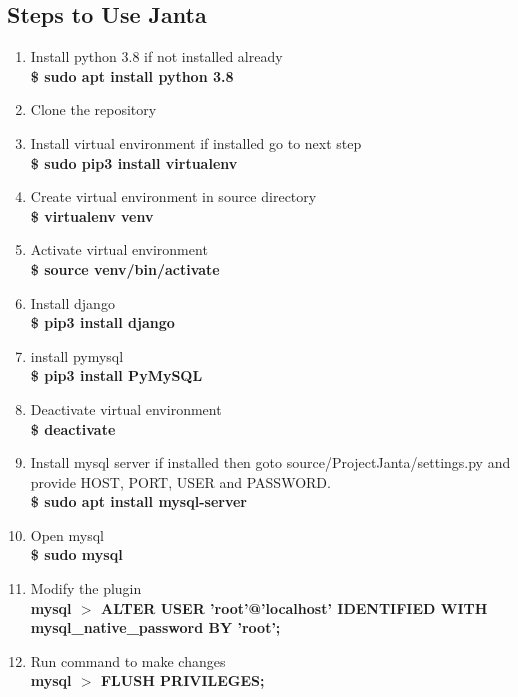 \documentclass{article}
\begin{document}
\subsection{Steps to Use Janta}
\begin{enumerate}
    \item Install python 3.8 if not installed already\\
\textbf {\$ sudo apt install python 3.8}

\item Clone the repository

\item Install virtual environment if installed go to next step\\
\textbf {\$ sudo pip3 install virtualenv}


\item Create virtual environment in source directory\\
 \textbf {\$ virtualenv venv}


\item  Activate virtual environment\\
\textbf {\$ source venv/bin/activate}


\item Install django\\
\textbf {\$ pip3 install django}


\item  install pymysql\\
\textbf {\$ pip3 install PyMySQL}


\item  Deactivate virtual environment\\
\textbf {\$ deactivate}


\item  Install mysql server if installed then goto source/ProjectJanta/settings.py
and provide HOST, PORT, USER and PASSWORD.
\\
\textbf {\$ sudo apt install mysql-server}


\item  Open mysql
\\
\textbf {\$ sudo mysql}


\item  Modify the plugin
\\
\textbf {mysql $>$  ALTER USER 'root'@'localhost' IDENTIFIED WITH mysql\_native\_password BY 'root';}


\item  Run command to make changes
\\
\textbf {mysql $>$ FLUSH PRIVILEGES;}



\end{enumerate}
\end{document}
